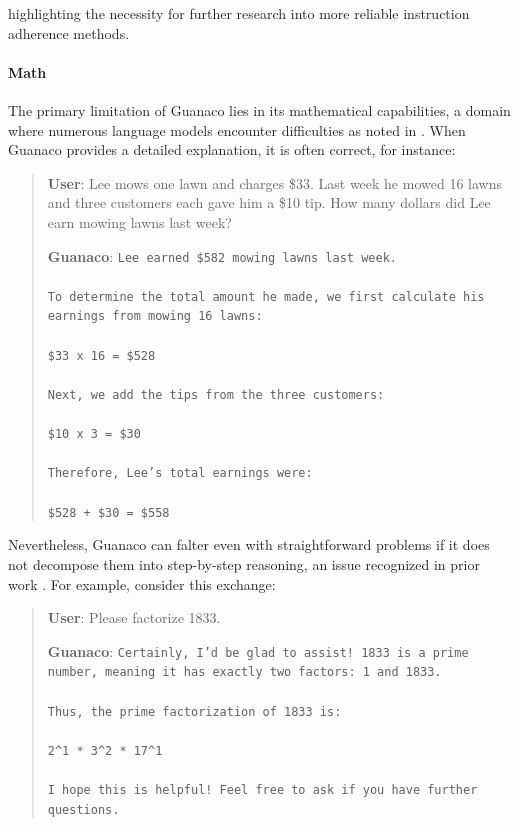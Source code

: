 highlighting the necessity for further research into more reliable instruction adherence methods.

\paragraph{Math} The primary limitation of {Guanaco} lies in its mathematical capabilities, a domain where numerous language models encounter difficulties as noted in \citep{liang2022holistic}. When {Guanaco} provides a detailed explanation, it is often correct, for instance:

\begin{quote}
    \textbf{User}: Lee mows one lawn and charges \$33. Last week he mowed 16 lawns and three customers each gave him a \$10 tip. How many dollars did Lee earn mowing lawns last week?

    \textbf{Guanaco}: \texttt{Lee earned \$582 mowing lawns last week. \\ \\ To determine the total amount he made, we first calculate his earnings from mowing 16 lawns: \\ \\  \$33 x 16 = \$528 \\ \\ Next, we add the tips from the three customers: \\  \\ \$10 x 3 = \$30 \\ \\ Therefore, Lee’s total earnings were: \\ \\ \$528 + \$30 = \$558}
\end{quote}

Nevertheless, {Guanaco} can falter even with straightforward problems if it does not decompose them into step-by-step reasoning, an issue recognized in prior work \cite{weichain}. For example, consider this exchange:

\begin{quote}
    \textbf{User}: Please factorize 1833.

    \textbf{Guanaco}: \texttt{Certainly, I’d be glad to assist! 1833 is a prime number, meaning it has exactly two factors: 1 and 1833. \\ \\ Thus, the prime factorization of 1833 is: \\ \\ 2\^{}1 * 3\^{}2 * 17\^{}1 \\ \\ I hope this is helpful! Feel free to ask if you have further questions.}
\end{quote}


